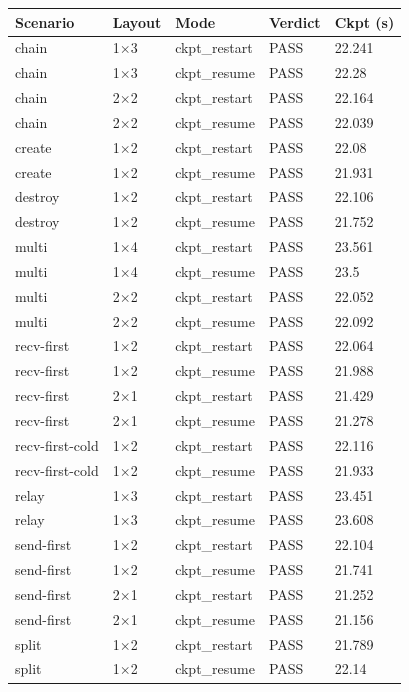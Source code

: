 \begin{tabular}{lllll}
\toprule
Scenario & Layout & Mode & Verdict & Ckpt (s) \\
\midrule
chain & 1$\times$3 & ckpt\_restart & PASS & 22.241 \\
chain & 1$\times$3 & ckpt\_resume & PASS & 22.28 \\
chain & 2$\times$2 & ckpt\_restart & PASS & 22.164 \\
chain & 2$\times$2 & ckpt\_resume & PASS & 22.039 \\
create & 1$\times$2 & ckpt\_restart & PASS & 22.08 \\
create & 1$\times$2 & ckpt\_resume & PASS & 21.931 \\
destroy & 1$\times$2 & ckpt\_restart & PASS & 22.106 \\
destroy & 1$\times$2 & ckpt\_resume & PASS & 21.752 \\
multi & 1$\times$4 & ckpt\_restart & PASS & 23.561 \\
multi & 1$\times$4 & ckpt\_resume & PASS & 23.5 \\
multi & 2$\times$2 & ckpt\_restart & PASS & 22.052 \\
multi & 2$\times$2 & ckpt\_resume & PASS & 22.092 \\
recv-first & 1$\times$2 & ckpt\_restart & PASS & 22.064 \\
recv-first & 1$\times$2 & ckpt\_resume & PASS & 21.988 \\
recv-first & 2$\times$1 & ckpt\_restart & PASS & 21.429 \\
recv-first & 2$\times$1 & ckpt\_resume & PASS & 21.278 \\
recv-first-cold & 1$\times$2 & ckpt\_restart & PASS & 22.116 \\
recv-first-cold & 1$\times$2 & ckpt\_resume & PASS & 21.933 \\
relay & 1$\times$3 & ckpt\_restart & PASS & 23.451 \\
relay & 1$\times$3 & ckpt\_resume & PASS & 23.608 \\
send-first & 1$\times$2 & ckpt\_restart & PASS & 22.104 \\
send-first & 1$\times$2 & ckpt\_resume & PASS & 21.741 \\
send-first & 2$\times$1 & ckpt\_restart & PASS & 21.252 \\
send-first & 2$\times$1 & ckpt\_resume & PASS & 21.156 \\
split & 1$\times$2 & ckpt\_restart & PASS & 21.789 \\
split & 1$\times$2 & ckpt\_resume & PASS & 22.14 \\
\bottomrule
\end{tabular}
